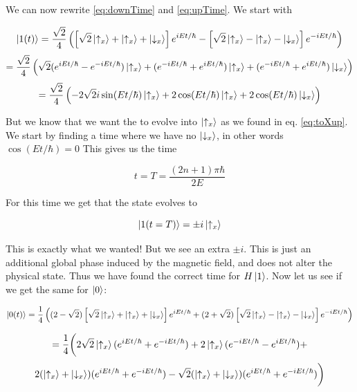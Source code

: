 \documentclass[a4paper,norsk, 10pt]{article}
\begin{document}
We can now rewrite \eqref{eq:downTime} and \eqref{eq:upTime}. We start with

\begin{equation}
\ket{1(t)} = \frac{\sqrt{2}}{4}\left(\left[\sqrt{2}\ket{\uparrow_x} + \ket{\uparrow_x} + \ket{\downarrow_x}\right] e^{iEt/\hbar} - \left[\sqrt{2}\ket{\uparrow_x} - \ket{\uparrow_x} - \ket{\downarrow_x}\right]e^{-iEt/\hbar}\right)
\end{equation}
\begin{equation}
= \frac{\sqrt{2}}{4}\left(\sqrt{2}(e^{iEt/\hbar}- e^{-iEt/\hbar})\ket{\uparrow_x} + (e^{-iEt/\hbar}+ e^{iEt/\hbar})\ket{\uparrow_x} + (e^{-iEt/\hbar}+ e^{iEt/\hbar})\ket{\downarrow_x}\right)
\end{equation}
\begin{equation}
=\frac{\sqrt{2}}{4}\left(-2\sqrt{2}i\sin(Et/\hbar)\ket{\uparrow_x} + 2\cos(Et/\hbar)\ket{\uparrow_x} +2 \cos(Et/\hbar)\ket{\downarrow_x}\right)
\end{equation}

But we know that we want the to evolve into $\ket{\uparrow_x}$ as we found in eq. \eqref{eq:toXup}. We start by finding a time where we have no $\ket{\downarrow_x}$, in other words $\cos(Et/\hbar) = 0$ This gives us the time

\begin{equation}
t = T = \frac{(2n + 1)\pi\hbar}{2E}
\end{equation}

For this time we get that the state evolves to

\begin{equation}
\ket{1(t = T)} = 
\pm i \ket{\uparrow_x}
\label{eq:upEvolved}
\end{equation}

This is exactly what we wanted! But we see an extra $\pm i$. This is just an additional global phase induced by the magnetic field, and does not alter the physical state. Thus we have found the correct time for $H\ket{1}$. Now let us see if we get the same for $\ket{0}$:

\begin{equation}
\ket{0(t)} =
\frac{1}{4}\left((2-\sqrt{2})\left[\sqrt{2}\ket{\uparrow_x} + \ket{\uparrow_x} + \ket{\downarrow_x}\right] e^{iEt/\hbar} + (2+\sqrt{2})\left[\sqrt{2}\ket{\uparrow_x} - \ket{\uparrow_x} - \ket{\downarrow_x}\right]e^{-iEt/\hbar}\right)
\end{equation}

\begin{equation}
=\frac{1}{4}\bigg(2\sqrt{2}\ket{\uparrow_x}(e^{iEt/\hbar} + e^{-iEt/\hbar}) 
+ 2\ket{\uparrow_x}(e^{-iEt/\hbar} - e^{iEt/\hbar}) + 
\end{equation}
\begin{equation}
2(\ket{\uparrow_x} + \ket{\downarrow_x})(e^{iEt/\hbar} + e^{-iEt/\hbar}) 
-\sqrt{2}(\ket{\uparrow_x} + \ket{\downarrow_x})(e^{iEt/\hbar} + e^{-iEt/\hbar}) 
\bigg)
\end{equation}
\end{document}
